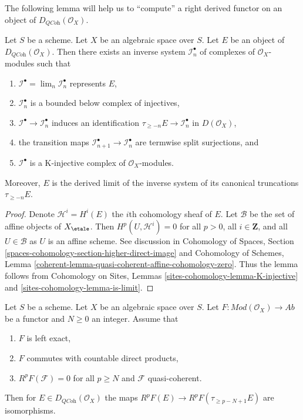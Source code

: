 \noindent
The following lemma will help us to ``compute'' a right derived functor
on an object of $D_{\textit{QCoh}}(\mathcal{O}_X)$.

\begin{lemma}
\label{lemma-nice-K-injective}
Let $S$ be a scheme. Let $X$ be an algebraic space over $S$. Let $E$ be an
object of $D_{\textit{QCoh}}(\mathcal{O}_X)$. Then there exists an inverse
system $\mathcal{I}_n^\bullet$ of complexes of $\mathcal{O}_X$-modules
such that
\begin{enumerate}
\item $\mathcal{I}^\bullet = \lim_n \mathcal{I}_n^\bullet$ represents $E$,
\item $\mathcal{I}_n^\bullet$ is a bounded below complex of injectives,
\item $\mathcal{I}^\bullet \to \mathcal{I}_n^\bullet$ induces an
identification $\tau_{\geq -n}E \to \mathcal{I}_n^\bullet$
in $D(\mathcal{O}_X)$,
\item the transition maps
$\mathcal{I}_{n + 1}^\bullet \to \mathcal{I}_n^\bullet$
are termwise split surjections, and
\item $\mathcal{I}^\bullet$ is a K-injective complex of
$\mathcal{O}_X$-modules.
\end{enumerate}
Moreover, $E$ is the derived limit of the inverse system of
its canonical truncations $\tau_{\geq -n}E$.
\end{lemma}

\begin{proof}
Denote $\mathcal{H}^i = H^i(E)$ the $i$th cohomology sheaf of $E$.
Let $\mathcal{B}$ be the set of affine objects of $X_\etale$.
Then $H^p(U, \mathcal{H}^i) = 0$ for all $p > 0$, all $i \in \mathbf{Z}$,
and all $U \in \mathcal{B}$ as $U$ is an affine scheme.
See discussion in
Cohomology of Spaces, Section
\ref{spaces-cohomology-section-higher-direct-image}
and
Cohomology of Schemes, Lemma
\ref{coherent-lemma-quasi-coherent-affine-cohomology-zero}.
Thus the lemma follows from
Cohomology on Sites, Lemmas \ref{sites-cohomology-lemma-K-injective} and
\ref{sites-cohomology-lemma-is-limit}.
\end{proof}

\begin{lemma}
\label{lemma-application-nice-K-injective}
Let $S$ be a scheme. Let $X$ be an algebraic space over $S$.
Let $F : \textit{Mod}(\mathcal{O}_X) \to \textit{Ab}$
be a functor and $N \geq 0$ an integer. Assume that
\begin{enumerate}
\item $F$ is left exact,
\item $F$ commutes with countable direct products,
\item $R^pF(\mathcal{F}) = 0$ for all $p \geq N$ and $\mathcal{F}$
quasi-coherent.
\end{enumerate}
Then for $E \in D_{\textit{QCoh}}(\mathcal{O}_X)$ the maps
$R^pF(E) \to R^pF(\tau_{\geq p - N + 1}E)$ are isomorphisms.
\end{lemma}

